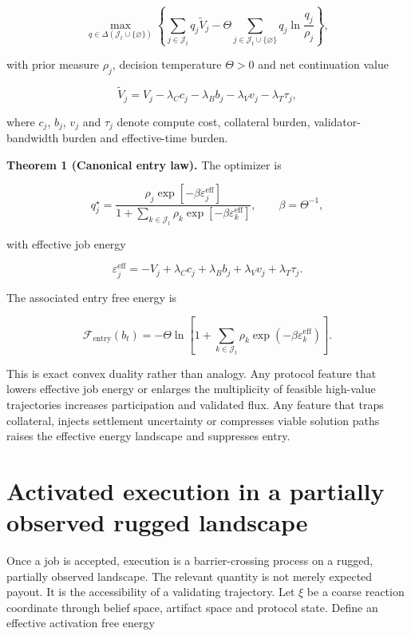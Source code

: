 \[
\max_{q \in \Delta(\mathcal{J}_t \cup \{\varnothing\})}
\left\{
\sum_{j \in \mathcal{J}_t} q_j \widetilde V_j
- \Theta \sum_{j \in \mathcal{J}_t \cup \{\varnothing\}} q_j \ln \frac{q_j}{\rho_j}
\right\},
\]

with prior measure \(\rho_j\), decision temperature \(\Theta>0\) and net
continuation value

\[
\widetilde V_j = V_j - \lambda_C c_j - \lambda_B b_j - \lambda_V v_j - \lambda_T \tau_j,
\]

where \(c_j\), \(b_j\), \(v_j\) and \(\tau_j\) denote compute cost,
collateral burden, validator-bandwidth burden and effective-time burden.

\textbf{Theorem 1 (Canonical entry law).} The optimizer is

\[
q_j^{\star} = \frac{\rho_j\exp[-\beta\varepsilon_j^{\mathrm{eff}}]}
{1 + \sum_{k \in \mathcal{J}_t}\rho_k\exp[-\beta\varepsilon_k^{\mathrm{eff}}]},
\qquad \beta = \Theta^{-1},
\]

with effective job energy

\[
\varepsilon_j^{\mathrm{eff}} = -V_j + \lambda_C c_j + \lambda_B b_j + \lambda_V v_j + \lambda_T \tau_j.
\]

The associated entry free energy is

\[
\mathcal{F}_{\mathrm{entry}}(b_t)
= -\Theta \ln\!\left[1 + \sum_{k\in\mathcal{J}_t}\rho_k\exp(-\beta\varepsilon_k^{\mathrm{eff}})\right].
\]

This is exact convex duality rather than analogy. Any protocol feature
that lowers effective job energy or enlarges the multiplicity of
feasible high-value trajectories increases participation and validated
flux. Any feature that traps collateral, injects settlement uncertainty
or compresses viable solution paths raises the effective energy
landscape and suppresses entry.

\section{Activated execution in a partially observed rugged
landscape}\label{activated-execution-in-a-partially-observed-rugged-landscape}

Once a job is accepted, execution is a barrier-crossing process on a
rugged, partially observed landscape. The relevant quantity is not
merely expected payout. It is the accessibility of a validating
trajectory. Let \(\xi\) be a coarse reaction coordinate through belief
space, artifact space and protocol state. Define an effective activation
free energy

